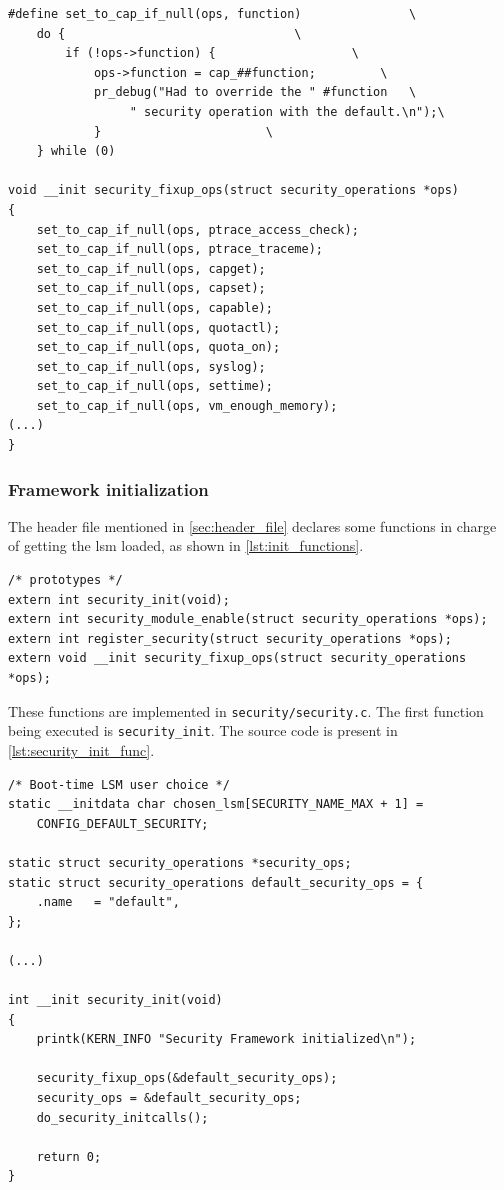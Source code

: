 \begin{lstlisting}[style=CInputStyle, caption=\texttt{security\_fixup\_ops} function (Linux kernel v3.11), label=lst:fixup_ops]
#define set_to_cap_if_null(ops, function)				\
	do {								\
		if (!ops->function) {					\
			ops->function = cap_##function;			\
			pr_debug("Had to override the " #function	\
				 " security operation with the default.\n");\
			}						\
	} while (0)

void __init security_fixup_ops(struct security_operations *ops)
{
	set_to_cap_if_null(ops, ptrace_access_check);
	set_to_cap_if_null(ops, ptrace_traceme);
	set_to_cap_if_null(ops, capget);
	set_to_cap_if_null(ops, capset);
	set_to_cap_if_null(ops, capable);
	set_to_cap_if_null(ops, quotactl);
	set_to_cap_if_null(ops, quota_on);
	set_to_cap_if_null(ops, syslog);
	set_to_cap_if_null(ops, settime);
	set_to_cap_if_null(ops, vm_enough_memory);
(...)
}
\end{lstlisting}

\subsubsection{Framework initialization}
\label{sec:framework_initialization}

The header file mentioned in \autoref{sec:header_file} declares some functions in charge of getting the \gls{lsm} loaded, as shown in \autoref{lst:init_functions}.

\begin{lstlisting}[style=CInputStyle, caption=Framework initialization functions (Linux kernel v3.11), label=lst:init_functions]
/* prototypes */
extern int security_init(void);
extern int security_module_enable(struct security_operations *ops);
extern int register_security(struct security_operations *ops);
extern void __init security_fixup_ops(struct security_operations *ops);
\end{lstlisting}

These functions are implemented in \texttt{security/security.c}. The first function being executed is \texttt{security\_init}. The source code is present in \autoref{lst:security_init_func}.

\begin{lstlisting}[style=CInputStyle, caption=\texttt{security\_init} function (Linux kernel v3.11), label=lst:security_init_func]
/* Boot-time LSM user choice */
static __initdata char chosen_lsm[SECURITY_NAME_MAX + 1] =
	CONFIG_DEFAULT_SECURITY;

static struct security_operations *security_ops;
static struct security_operations default_security_ops = {
	.name	= "default",
};

(...)

int __init security_init(void)
{
	printk(KERN_INFO "Security Framework initialized\n");

	security_fixup_ops(&default_security_ops);
	security_ops = &default_security_ops;
	do_security_initcalls();

	return 0;
}
\end{lstlisting}

